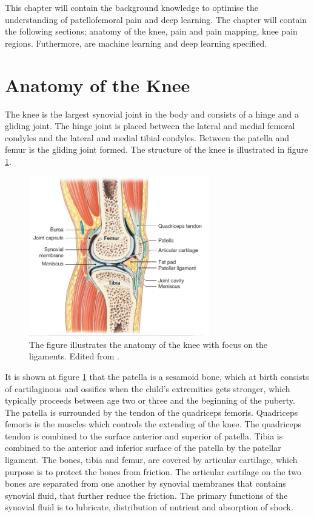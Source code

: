 This chapter will contain the background knowledge to optimise the understanding of patellofemoral pain and deep learning. The chapter will contain the following sections; anatomy of the knee, pain and pain mapping, knee pain regions. Futhermore, are machine learning and deep learning specified.


\section{Anatomy of the Knee}
The knee is the largest synovial joint in the body and consists of a hinge and a gliding joint. The hinge joint is placed between the lateral and medial femoral condyles and the lateral and medial tibial condyles. Between the patella and femur is the gliding joint formed. The structure of the knee is illustrated in figure \ref{fig:bonestruc}.\citep{Martini2012}

\begin{figure} [H]
\centering
\includegraphics[width=0.7\textwidth]{figures/bonestruc}
\caption{The figure illustrates the anatomy of the knee with focus on the ligaments. Edited from \citep{Martini2012}.}
\label{fig:bonestruc}
\end{figure}

\noindent
It is shown at figure \ref{fig:bonestruc} that the patella is a sesamoid bone, which at birth consists of cartilaginous and ossifies when the child’s extremities gets stronger, which typically proceeds between age two or three and the beginning of the puberty. 
The patella is surrounded by the tendon of the quadriceps femoris. Quadriceps femoris is the muscles which controls the extending of the knee. The quadriceps tendon is combined to the surface anterior and superior of patella. Tibia is combined to the anterior and inferior surface of the patella by the patellar ligament. The bones, tibia and femur, are covered by articular cartilage, which purpose is to protect the bones from friction. The articular cartilage on the two bones are separated from one another by synovial membranes that contains synovial fluid, that further reduce the friction. The primary functions of the synovial fluid is to lubricate, distribution of nutrient and absorption of shock.\citep{Martini2012}


